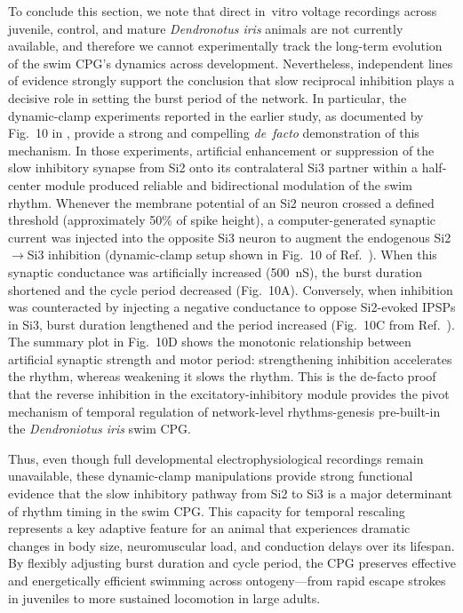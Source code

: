 \documentclass[nofootinbib,aip,amsmath,amssymb,reprint,twocolumn,10pt]{revtex4-2}
\begin{document}
To conclude this section, we note that direct in~vitro voltage recordings across juvenile, control, and mature \textit{Dendronotus iris} animals are not currently available, and therefore we cannot experimentally track the long-term evolution of the swim CPG’s dynamics across development. Nevertheless, independent lines of evidence strongly support the conclusion that slow reciprocal inhibition plays a decisive role in setting the burst period of the network. In particular, the dynamic-clamp experiments reported in the earlier study, as documented by Fig.~10 in \cite{sakurai2022bursting}, provide a strong and compelling {\em de~facto} demonstration of this mechanism. In those experiments, artificial enhancement or suppression of the slow inhibitory synapse from Si2 onto its contralateral Si3 partner within a half-center module produced reliable and bidirectional modulation of the swim rhythm. Whenever the membrane potential of an Si2 neuron crossed a defined threshold (approximately 50\% of spike height), a computer-generated synaptic current was injected into the opposite Si3 neuron to augment the endogenous Si2$\rightarrow$Si3 inhibition (dynamic-clamp setup shown in Fig.~10 of Ref.~\cite{sakurai2022bursting}). When this synaptic conductance was artificially increased (500~nS), the burst duration shortened and the cycle period decreased (Fig.~10A). Conversely, when inhibition was counteracted by injecting a negative conductance to oppose Si2-evoked IPSPs in Si3, burst duration lengthened and the period increased (Fig.~10C from Ref.~\cite{sakurai2022bursting}). The summary plot in Fig.~10D shows the monotonic relationship between artificial synaptic strength and motor period: strengthening inhibition accelerates the rhythm, whereas weakening it slows the rhythm. This is the de-facto proof that the reverse inhibition in the excitatory-inhibitory module provides the pivot mechanism of temporal regulation of network-level rhythms-genesis pre-built-in the {\em Dendroniotus iris} swim  CPG. 


Thus, even though full developmental electrophysiological recordings remain unavailable, these dynamic-clamp manipulations provide strong functional evidence that the slow inhibitory pathway from Si2 to Si3 is a major determinant of rhythm timing in the swim CPG. This capacity for temporal rescaling represents a key adaptive feature for an animal that experiences dramatic changes in body size, neuromuscular load, and conduction delays over its lifespan. By flexibly adjusting burst duration and cycle period, the CPG preserves effective and energetically efficient swimming across ontogeny—from rapid escape strokes in juveniles to more sustained locomotion in large adults.  
\end{document}
